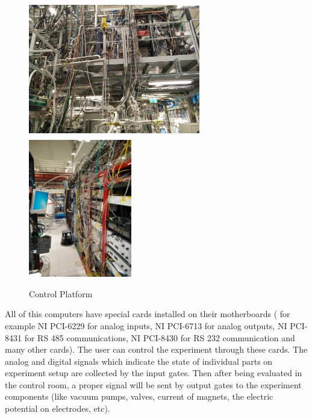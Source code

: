 \documentclass[12pt,a4paper]{article}
\begin{document}
\begin{figure}[h]

\includegraphics[height=60mm, width=75mm]{control_platform-1}
\includegraphics[width=45mm]{control_plattform2}
\caption{Control Platform}
\label{platform}
\end{figure}		
	
All of this computers have special cards installed on their motherboards ( for example NI PCI-6229 for analog inputs, NI PCI-6713 for analog outputs, NI PCI-8431 for RS 485 communications, NI PCI-8430 for RS 232 communication and many other cards). The user can control the experiment through these cards. The analog and digital signals which indicate the state of individual parts on experiment setup are collected by the input gates. Then after being evaluated in the control room, a proper signal will be sent by output gates to the experiment components (like vacuum pumps, valves, current of magnets, the electric potential on electrodes, etc).
\end{document}
